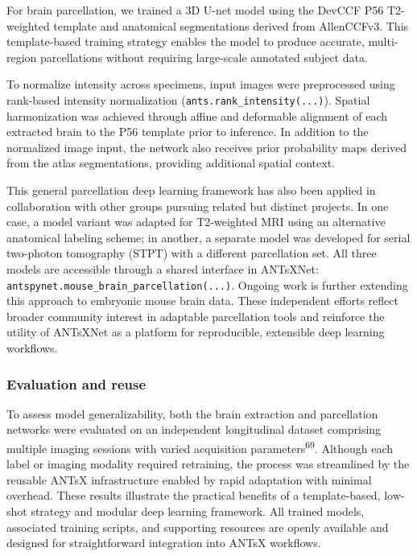 \documentclass[
  12pt,
]{article}
\begin{document}
For brain parcellation, we trained a 3D U-net model using the DevCCF P56
T2-weighted template and anatomical segmentations derived from
AllenCCFv3. This template-based training strategy enables the model to
produce accurate, multi-region parcellations without requiring
large-scale annotated subject data.

To normalize intensity across specimens, input images were preprocessed
using rank-based intensity normalization
(\texttt{ants.rank\_intensity(...)}). Spatial harmonization was achieved
through affine and deformable alignment of each extracted brain to the
P56 template prior to inference. In addition to the normalized image
input, the network also receives prior probability maps derived from the
atlas segmentations, providing additional spatial context.

This general parcellation deep learning framework has also been applied
in collaboration with other groups pursuing related but distinct
projects. In one case, a model variant was adapted for T2-weighted MRI
using an alternative anatomical labeling scheme; in another, a separate
model was developed for serial two-photon tomography (STPT) with a
different parcellation set. All three models are accessible through a
shared interface in ANTsXNet:
\texttt{antspynet.mouse\_brain\_parcellation(...)}. Ongoing work is
further extending this approach to embryonic mouse brain data. These
independent efforts reflect broader community interest in adaptable
parcellation tools and reinforce the utility of ANTsXNet as a platform
for reproducible, extensible deep learning workflows.

\subsubsection{Evaluation and reuse}\label{evaluation-and-reuse}

To assess model generalizability, both the brain extraction and
parcellation networks were evaluated on an independent longitudinal
dataset comprising multiple imaging sessions with varied acquisition
parameters\textsuperscript{69}. Although each label or imaging modality
required retraining, the process was streamlined by the reusable ANTsX
infrastructure enabled by rapid adaptation with minimal overhead. These
results illustrate the practical benefits of a template-based, low-shot
strategy and modular deep learning framework. All trained models,
associated training scripts, and supporting resources are openly
available and designed for straightforward integration into ANTsX
workflows.
\end{document}
